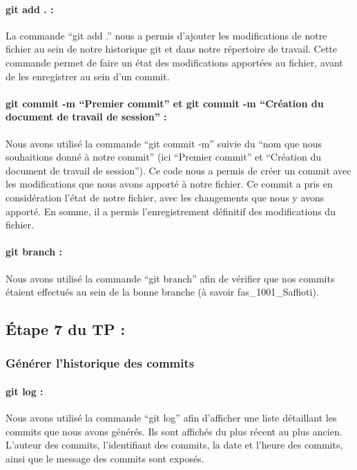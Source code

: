 \documentclass[
  letterpaper,
  DIV=11,
  numbers=noendperiod]{scrartcl}
\let\oldparagraph\paragraph
\renewcommand{\paragraph}[1]{\oldparagraph{#1}\mbox{}}
\begin{document}
\hypertarget{git-add-.}{%
\paragraph{git add . :}\label{git-add-.}}

La commande ``git add .'' nous a permis d'ajouter les modifications de
notre fichier au sein de notre historique git et dans notre répertoire
de travail. Cette commande permet de faire un état des modifications
apportées au fichier, avant de les enregistrer au sein d'un commit.

\hypertarget{git-commit--m-premier-commit-et-git-commit--m-cruxe9ation-du-document-de-travail-de-session}{%
\paragraph{git commit -m ``Premier commit'' et git commit -m ``Création
du document de travail de session''
:}\label{git-commit--m-premier-commit-et-git-commit--m-cruxe9ation-du-document-de-travail-de-session}}

Nous avons utilisé la commande ``git commit -m'' suivie du ``nom que
nous souhaitions donné à notre commit'' (ici ``Premier commit'' et
``Création du document de travail de session''). Ce code nous a permis
de créer un commit avec les modifications que nous avons apporté à notre
fichier. Ce commit a pris en considération l'état de notre fichier, avec
les changements que nous y avons apporté. En somme, il a permis
l'enregistrement définitif des modifications du fichier.

\hypertarget{git-branch}{%
\paragraph{git branch :}\label{git-branch}}

Nous avons utilisé la commande ``git branch'' afin de vérifier que nos
commits étaient effectués au sein de la bonne branche (à savoir
fas\_1001\_Saffioti).

\hypertarget{uxe9tape-7-du-tp}{%
\subsection{Étape 7 du TP :}\label{uxe9tape-7-du-tp}}

\hypertarget{guxe9nuxe9rer-lhistorique-des-commits}{%
\subsubsection{Générer l'historique des
commits}\label{guxe9nuxe9rer-lhistorique-des-commits}}

\hypertarget{git-log}{%
\paragraph{git log :}\label{git-log}}

Nous avons utilisé la commande ``git log'' afin d'afficher une liste
détaillant les commits que nous avons générés. Ils sont affichés du plus
récent au plus ancien. L'auteur des commits, l'identifiant des commits,
la date et l'heure des commits, ainsi que le message des commits sont
exposés.
\end{document}
